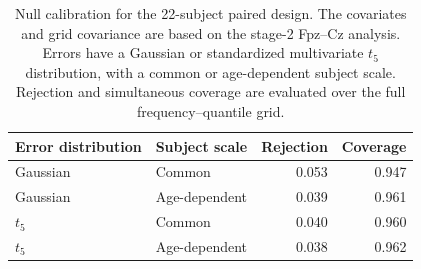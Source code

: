 \begin{table}[htbp]
\centering
\caption{Null calibration for the 22-subject paired design. The covariates and grid covariance are based on the stage-2 Fpz--Cz analysis. Errors have a Gaussian or standardized multivariate $t_5$ distribution, with a common or age-dependent subject scale. Rejection and simultaneous coverage are evaluated over the full frequency--quantile grid.}\label{tab:paired-calibration}
\begin{tabular}{llrr}
\toprule
Error distribution & Subject scale & Rejection & Coverage \\
\midrule
Gaussian & Common & 0.053 & 0.947 \\
Gaussian & Age-dependent & 0.039 & 0.961 \\
$t_5$ & Common & 0.040 & 0.960 \\
$t_5$ & Age-dependent & 0.038 & 0.962 \\
\bottomrule
\end{tabular}
\end{table}
